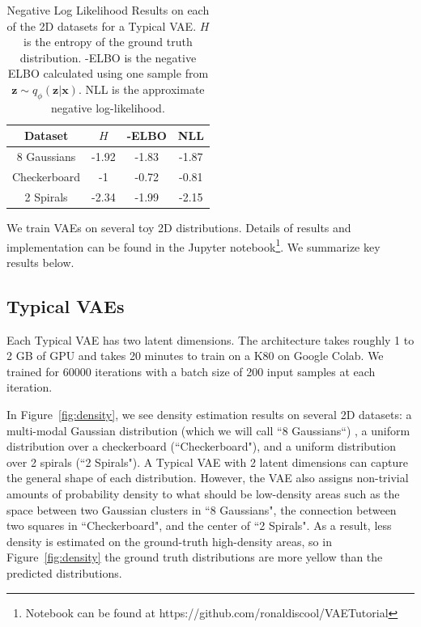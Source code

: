 \documentclass{article}
\begin{document}
\begin{table}
    \centering
    \begin{tabular}{|c|c|c|c|}
    \hline
        Dataset&$H$&-ELBO&NLL\\
        \hline
         8 Gaussians&  -1.92&-1.83&-1.87\\
         Checkerboard& -1&-0.72&-0.81\\
         2 Spirals& -2.34&-1.99&-2.15\\
         \hline
    \end{tabular}
    \caption{Negative Log Likelihood Results on each of the 2D datasets for a Typical VAE. $H$ is the entropy of the ground truth distribution. -ELBO is the negative ELBO calculated using one sample from $\mathbf{z}\sim q_\phi(\mathbf{z}|\mathbf{x})$. NLL is the approximate negative log-likelihood.}
    \label{tab:nll}
\end{table}

We train VAEs on several toy 2D distributions. Details of results and implementation can be found in the Jupyter notebook\footnote{Notebook can be found at https://github.com/ronaldiscool/VAETutorial}. We summarize key results below.

\subsection{Typical VAEs}

Each Typical VAE has two latent dimensions. The architecture takes roughly 1 to 2 GB of GPU and takes 20 minutes to train on a K80 on Google Colab. We trained for 60000 iterations with a batch size of 200 input samples at each iteration.

In Figure~\ref{fig:density}, we see density estimation results on several 2D datasets: a multi-modal Gaussian distribution (which we will call ``8 Gaussians``) , a uniform distribution over a checkerboard (``Checkerboard"), and a uniform distribution over 2 spirals (``2 Spirals"). A Typical VAE with 2 latent dimensions can capture the general shape of each distribution. However, the VAE also assigns non-trivial amounts of probability density to what should be low-density areas such as the space between two Gaussian clusters in ``8 Gaussians", the connection between two squares in ``Checkerboard", and the center of ``2 Spirals". As a result, less density is estimated on the ground-truth high-density areas, so in Figure~\ref{fig:density} the ground truth distributions are more yellow than the predicted distributions.
\end{document}
